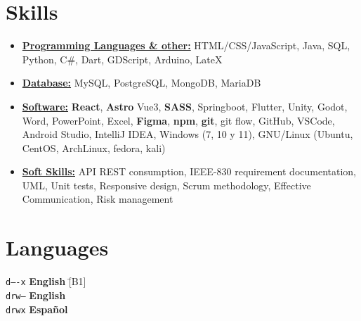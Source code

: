 \documentclass[11pt,a4paper,sans]{moderncv}
\newcommand{\sectionMargin}{-3mm}
\begin{document}
\section{Skills}{
\begin{itemize}[label=\textbullet, noitemsep]
\item {\underline{\textbf{Programming Languages \& other:}} 
    {HTML/CSS/JavaScript},
    {Java},
    {SQL},
    {Python},
    {C\#},
    {Dart},
    {GDScript},
    {Arduino},
    {LateX}
}
\item {\underline{\textbf{Database:}}
    {MySQL},
    {PostgreSQL},
    {MongoDB},
    {MariaDB}
}
\item {\underline{\textbf{Software:}}
    \textbf{React},
    \textbf{Astro}
    {Vue3},
    \textbf{SASS},
    {Springboot},
    {Flutter},
    {Unity},
    {Godot},
    {Word},
    {PowerPoint},
    {Excel}, 
    \textbf{Figma},
    \textbf{npm},
    \textbf{git},
    {git flow},
    {GitHub},
    {VSCode},
    {Android Studio},
    {IntelliJ IDEA},
    {Windows} (7, 10 y 11),
    {GNU/Linux} (Ubuntu, CentOS, ArchLinux, fedora, kali)
}
\item {\underline{\textbf{Soft Skills:}}
    {API REST} consumption,
    {IEEE-830} requirement documentation,
    {UML},
    {Unit tests},
    {Responsive design},
    {Scrum} methodology,
    Effective Communication, 
    {Risk management}
}
\end{itemize}}

\vspace*{\sectionMargin}

\section{Languages}
\begin{tabbing}
    \texttt{d----x} \hspace{1mm}\= \textbf{English} \hspace{1mm}\= [B1] \\
    \texttt{drw--} \> \textbf{English} \> [Technical] \\
    \texttt{drwx} \> \textbf{Español} \> [Native] \\
\end{tabbing}
\end{document}
